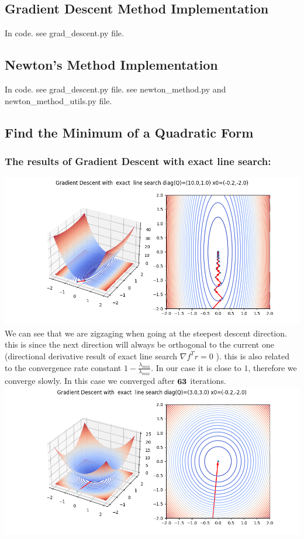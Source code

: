 \documentclass{article}
\begin{document}
\subsection{Gradient Descent Method Implementation}
In code. see grad\_descent.py file.
\subsection{Newton’s Method Implementation}
In code. see grad\_descent.py file. see newton\_method.py and newton\_method\_utils.py file.
\newpage
\subsection{Find the Minimum of a Quadratic Form}
\subsubsection{The results of Gradient Descent with exact line search:}
\includegraphics[scale=0.5]{grad_descent_exact_1.png}\\
We can see that we are zigzaging when going at the steepest descent direction. this is since the next direction will always be orthogonal to the current one (directional derivative result of exact line search $\nabla f^T r = 0$ ). this is also related to the convergence rate constant $1 - \frac{\lambda_{min}}{\lambda_{max}}$. In our case it is close to $1$, therefore we converge slowly. In this case we converged after $\bold{63}$ iterations.\\
\includegraphics[scale=0.5]{grad_descent_exact_2_circle.png}
\end{document}
